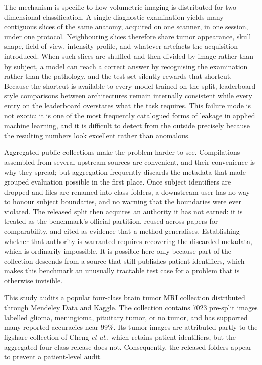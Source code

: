 ﻿\documentclass[twocolumn]{article}
\begin{document}
The mechanism is specific to how volumetric imaging is distributed for two-dimensional classification. A single diagnostic examination yields many contiguous slices of the same anatomy, acquired on one scanner, in one session, under one protocol. Neighbouring slices therefore share tumor appearance, skull shape, field of view, intensity profile, and whatever artefacts the acquisition introduced. When such slices are shuffled and then divided by image rather than by subject, a model can reach a correct answer by recognising the examination rather than the pathology, and the test set silently rewards that shortcut. Because the shortcut is available to every model trained on the split, leaderboard-style comparisons between architectures remain internally consistent while every entry on the leaderboard overstates what the task requires. This failure mode is not exotic: it is one of the most frequently catalogued forms of leakage in applied machine learning\cite{kapoor2023leakage}, and it is difficult to detect from the outside precisely because the resulting numbers look excellent rather than anomalous.

Aggregated public collections make the problem harder to see. Compilations assembled from several upstream sources are convenient, and their convenience is why they spread; but aggregation frequently discards the metadata that made grouped evaluation possible in the first place. Once subject identifiers are dropped and files are renamed into class folders, a downstream user has no way to honour subject boundaries, and no warning that the boundaries were ever violated. The released split then acquires an authority it has not earned: it is treated as the benchmark's official partition, reused across papers for comparability, and cited as evidence that a method generalises. Establishing whether that authority is warranted requires recovering the discarded metadata, which is ordinarily impossible. It is possible here only because part of the collection descends from a source that still publishes patient identifiers, which makes this benchmark an unusually tractable test case for a problem that is otherwise invisible.

This study audits a popular four-class brain tumor MRI collection distributed through Mendeley Data and Kaggle\cite{ghaffar2024dataset,nickparvar2021dataset}. The collection contains 7023 pre-split images labelled glioma, meningioma, pituitary tumor, or no tumor, and has supported many reported accuracies near 99\%. Its tumor images are attributed partly to the figshare collection of Cheng \textit{et al.}\cite{cheng2015enhanced}, which retains patient identifiers, but the aggregated four-class release does not. Consequently, the released folders appear to prevent a patient-level audit.
\end{document}
